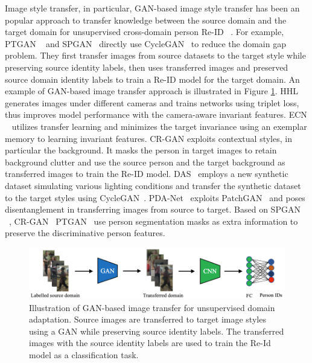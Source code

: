\documentclass[a4paper,fleqn]{cas-dc}
\begin{document}
Image style transfer, in particular, GAN-based image style transfer has been an popular approach to transfer knowledge between the source domain and the target domain for unsupervised cross-domain person Re-ID ~\cite{li_cross-dataset_2019,liu_adaptive_2019,zhong_generalizing_2018,wei_person_2018,deng_image-image_2018,liu_adaptive_2019}. For example, PTGAN ~\cite{wei_person_2018} and SPGAN~\cite{deng_image-image_2018} directly use CycleGAN~\cite{zhu_unpaired_2017} to reduce the domain gap problem. They first transfer images from source datasets to the target style while preserving source identity labels, then uses transferred images and preserved source domain identity labels to train a Re-ID model for the target domain. An example of GAN-based image transfer approach is illustrated in Figure \ref{fig:gan}. HHL ~\cite{zhong_generalizing_2018} generates images under different cameras and trains networks using triplet loss, thus improves model performance with the camera-aware invariant features. ECN ~\cite{zhong_invariance_2019} utilizes transfer learning and minimizes the target invariance using an exemplar memory to learning invariant features. CR-GAN\cite{chen_instance-guided_2019} exploits contextual styles, in particular the background. It masks the person in target images to retain background clutter and use the source person and the target background as transferred images to train the Re-ID model. DAS~\cite{bak_domain_2018} employs a new synthetic dataset simulating various lighting conditions and transfer the synthetic dataset to the target styles using CycleGAN~\cite{zhu_unpaired_2017}. PDA-Net~\cite{li_cross-dataset_2019} exploits PatchGAN~\cite{isola_image--image_2017} and poses disentanglement in transferring images from source to target. Based on SPGAN ~\cite{deng_image-image_2018}, CR-GAN~\cite{chen_instance-guided_2019} PTGAN~\cite{wei_person_2018} use person segmentation masks as extra information to preserve the discriminative person features. 

\begin{figure}[t]
\begin{center}
\includegraphics [width=0.8\linewidth]{gan.PNG}
\end{center}
  \caption{Illustration of GAN-based image transfer for unsupervised domain adaptation. Source images are transferred to target image styles using a GAN while preserving source identity labels. The transferred images with the source identity labels are used to train the Re-Id model as a classification task.}
\label{fig:gan}
\end{figure}
\end{document}
